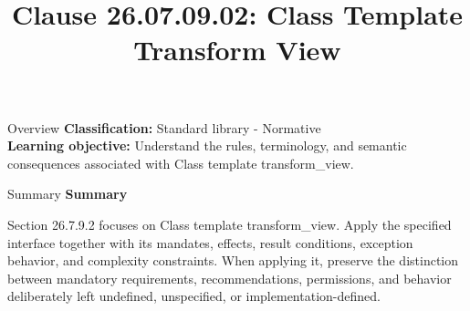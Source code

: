 \documentclass[10pt,letterpaper]{article}
\title{Clause 26.07.09.02: Class Template Transform View}
\author{}
\date{}
\begin{document}
\maketitle
\begin{CornellOverviewBox}{Overview}
\textbf{Classification:} Standard library - Normative\\[2pt]
\textbf{Learning objective:} Understand the rules, terminology, and semantic consequences associated with Class template transform\_view.
\end{CornellOverviewBox}\begin{CornellSummaryBox}{Summary}
{\sffamily\bfseries\color{Accent} Summary}\par\vspace{3pt}Section 26.7.9.2 focuses on Class template transform\_view. Apply the specified interface together with its mandates, effects, result conditions, exception behavior, and complexity constraints. When applying it, preserve the distinction between mandatory requirements, recommendations, permissions, and behavior deliberately left undefined, unspecified, or implementation-defined.
\end{CornellSummaryBox}
\end{document}
